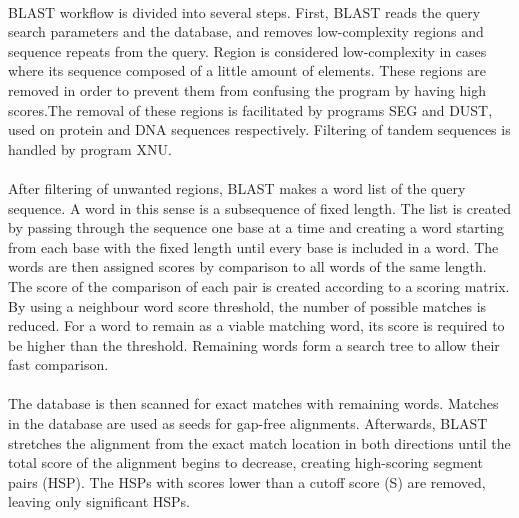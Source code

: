 \paragraph*{}
BLAST workflow is divided into several steps. First, BLAST reads the query search parameters and the database, and removes low-complexity regions and sequence repeats from the query. Region is considered low-complexity in cases where its sequence composed of a little amount of elements. These regions are removed in order to prevent them from confusing the program by having high scores.The removal of these regions is facilitated by programs SEG and DUST, used on protein and DNA sequences respectively. Filtering of tandem sequences is handled by program XNU. 
\paragraph*{}
After filtering of unwanted regions, BLAST makes a word list of the query sequence. A word in this sense is a subsequence of fixed length. The list is created by passing through the sequence one base at a time and creating a word starting from each base with the fixed length until every base is included in a word. The words are then assigned scores by comparison to all words of the same length. The score of the comparison of each pair is created according to a scoring matrix. By using a neighbour word score threshold, the number of possible matches is reduced. For a word to remain as a viable matching word, its score is required to be higher than the threshold. Remaining words form a search tree to allow their fast comparison.
\paragraph*{}
The database is then scanned for exact matches with remaining words. Matches in the database are used as seeds for gap-free alignments. Afterwards, BLAST stretches the alignment from the exact match location in both directions until the total score of the alignment begins to decrease, creating high-scoring segment pairs (HSP). The HSPs with scores lower than a cutoff score (S) are removed, leaving only significant HSPs.
